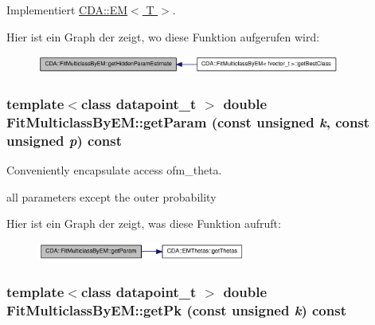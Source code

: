 Implementiert \hyperlink{classCDA_1_1EM_a8fa4fea4987c54f6ae1499492cc9130c}{CDA::EM$<$ T $>$}.



Hier ist ein Graph der zeigt, wo diese Funktion aufgerufen wird:\nopagebreak
\begin{figure}[H]
\begin{center}
\leavevmode
\includegraphics[width=283pt]{classCDA_1_1FitMulticlassByEM_a62588d5a6dcc8bc7af432b26ee5be5ab_icgraph}
\end{center}
\end{figure}


\hypertarget{classCDA_1_1FitMulticlassByEM_a4185d0f323087ef9112e903a2782fdfd}{
\subsubsection[{getParam}]{\setlength{\rightskip}{0pt plus 5cm}template$<$class datapoint\_\-t $>$ double FitMulticlassByEM::getParam (const unsigned {\em k}, \/  const unsigned {\em p}) const}}
\label{classCDA_1_1FitMulticlassByEM_a4185d0f323087ef9112e903a2782fdfd}


Conveniently encapsulate access ofm\_\-theta. 

all parameters except the outer probability 

Hier ist ein Graph der zeigt, was diese Funktion aufruft:\nopagebreak
\begin{figure}[H]
\begin{center}
\leavevmode
\includegraphics[width=194pt]{classCDA_1_1FitMulticlassByEM_a4185d0f323087ef9112e903a2782fdfd_cgraph}
\end{center}
\end{figure}


\hypertarget{classCDA_1_1FitMulticlassByEM_a869530b76ee4b40d38d3fb80ea0932aa}{
\subsubsection[{getPk}]{\setlength{\rightskip}{0pt plus 5cm}template$<$class datapoint\_\-t $>$ double FitMulticlassByEM::getPk (const unsigned {\em k}) const}}
\label{classCDA_1_1FitMulticlassByEM_a869530b76ee4b40d38d3fb80ea0932aa}



